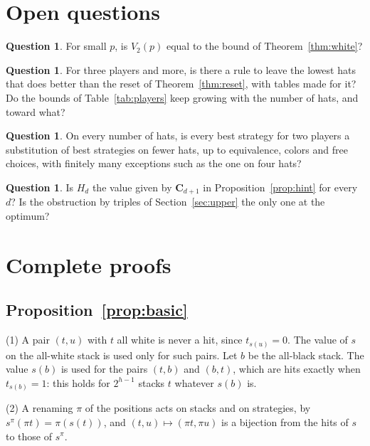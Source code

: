 \documentclass[11pt,a4paper]{article}
\theoremstyle{definition}
\newtheorem{question}[theorem]{Question}
\theoremstyle{remark}
\newcommand{\C}{\mathbf{C}}
\begin{document}
\section{Open questions}

\begin{question}
For small $p$, is $V_2(p)$ equal to the bound of
Theorem~\ref{thm:white}?
\end{question}

\begin{question}
For three players and more, is there a rule to leave the lowest hats
that does better than the reset of Theorem~\ref{thm:reset}, with tables
made for it? Do the bounds of Table~\ref{tab:players} keep growing with
the number of hats, and toward what?
\end{question}

\begin{question}
On every number of hats, is every best strategy for two players a
substitution of best strategies on fewer hats, up to equivalence, colors
and free choices, with finitely many exceptions such as the one on four
hats?
\end{question}

\begin{question}
Is $H_d$ the value given by $\C_{d+1}$ in Proposition~\ref{prop:hint}
for every $d$? Is the obstruction by triples of Section~\ref{sec:upper}
the only one at the optimum?
\end{question}


\appendix
\section{Complete proofs}\label{app:proofs}

\subsection{Proposition~\ref{prop:basic}}

(1) A pair $(t,u)$ with $t$ all white is never a hit, since
$t_{s(u)} = 0$. The value of $s$ on the all-white stack is used only for
such pairs. Let $b$ be the all-black stack. The value $s(b)$ is used for
the pairs $(t,b)$ and $(b,t)$, which are hits exactly when
$t_{s(b)} = 1$: this holds for $2^{h-1}$ stacks $t$ whatever $s(b)$ is.

(2) A renaming $\pi$ of the positions acts on stacks and on strategies,
by $s^\pi(\pi t) = \pi(s(t))$, and $(t,u) \mapsto (\pi t, \pi u)$ is a
bijection from the hits of $s$ to those of $s^\pi$.
\end{document}
